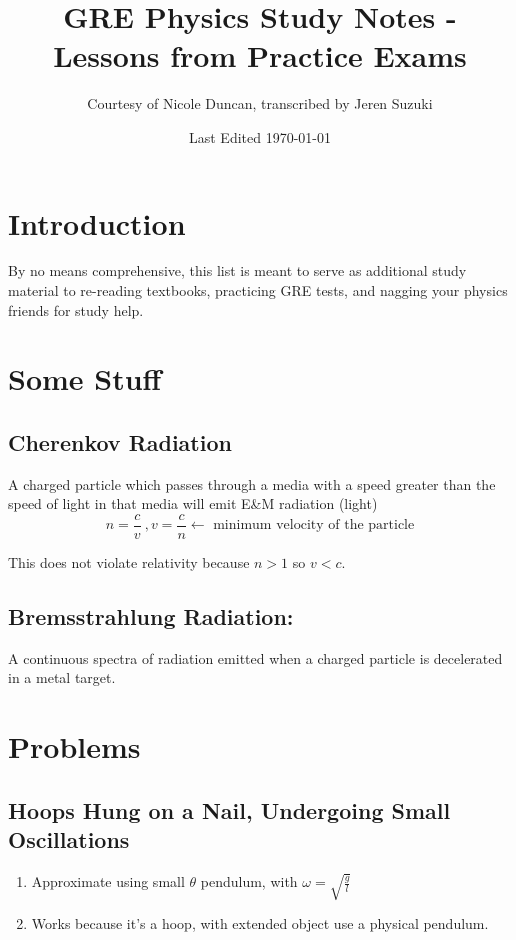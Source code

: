 \documentclass[10pt,letter]{article}
\title{GRE Physics Study Notes - Lessons from Practice Exams}
\author{Courtesy of Nicole Duncan, transcribed by Jeren Suzuki}
\date{Last Edited \today}
\begin{document}
\maketitle
{}
\newpage
\tableofcontents
\newpage
{}


\section*{Introduction}
By no means comprehensive, this list is meant to serve as additional study material to re-reading textbooks, practicing GRE tests, and nagging your physics friends for study help.


\section{Some Stuff}
\subsection{Cherenkov Radiation}
A charged particle which passes through a media with a speed greater than the speed of light in that media will emit E\&M radiation (light)
\begin{equation}
 n = \frac{c}{v}~, v= \frac{c}{n} \leftarrow \textrm{ minimum velocity of the particle}
\end{equation}

This does not violate relativity because $n>1$ so $v<c$.

\subsection{Bremsstrahlung Radiation:}
A continuous spectra of radiation emitted when a charged particle is decelerated in a metal target.

\section{Problems}
\subsection{Hoops Hung on a Nail, Undergoing Small Oscillations}
\begin{enumerate}
    \item Approximate using small $\theta$ pendulum, with $\omega = \sqrt{\frac{g}{l}}$
    \item Works because it's a hoop, with extended object use a physical pendulum.
\end{enumerate}
\end{document}
